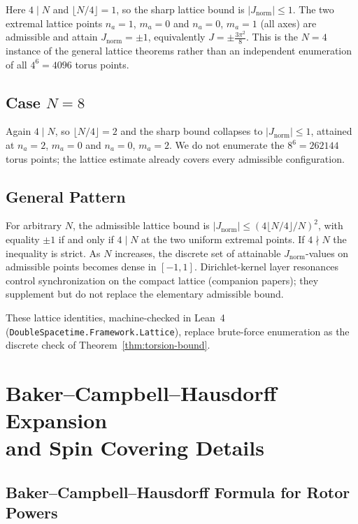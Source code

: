 \documentclass[a4paper]{article}
\theoremstyle{definition}
\theoremstyle{remark}
\newcommand{\Jnorm}{J_{\mathrm{norm}}}
\newcommand{\Jbound}{\frac{3\pi^2}{8}}
\begin{document}
Here \(4\mid N\) and \(\lfloor N/4\rfloor=1\), so the sharp lattice bound is \(|\Jnorm|\le 1\). The two extremal lattice points \(n_a=1\), \(m_a=0\) and \(n_a=0\), \(m_a=1\) (all axes) are admissible and attain \(\Jnorm=\pm 1\), equivalently \(J=\pm\Jbound\). This is the \(N=4\) instance of the general lattice theorems rather than an independent enumeration of all \(4^6=4096\) torus points.

\subsection{Case \texorpdfstring{$N = 8$}{N = 8}}

Again \(4\mid N\), so \(\lfloor N/4\rfloor=2\) and the sharp bound collapses to \(|\Jnorm|\le 1\), attained at \(n_a=2\), \(m_a=0\) and \(n_a=0\), \(m_a=2\). We do not enumerate the \(8^6=262144\) torus points; the lattice estimate already covers every admissible configuration.

\subsection{General Pattern}

For arbitrary \( N \), the admissible lattice bound is \(|\Jnorm|\le(4\lfloor N/4\rfloor/N)^2\), with equality \(\pm 1\) if and only if \(4\mid N\) at the two uniform extremal points. If \(4\nmid N\) the inequality is strict. As \( N \) increases, the discrete set of attainable \(\Jnorm\)-values on admissible points becomes dense in \([-1,1]\). Dirichlet-kernel layer resonances control synchronization on the compact lattice (companion papers); they supplement but do not replace the elementary admissible bound.

These lattice identities, machine-checked in Lean~4 (\texttt{DoubleSpacetime.Framework.Lattice}), replace brute-force enumeration as the discrete check of Theorem~\ref{thm:torsion-bound}.

\section[Baker--Campbell--Hausdorff expansion and spin covering]{Baker--Campbell--Hausdorff Expansion\\ and Spin Covering Details}

\subsection{Baker--Campbell--Hausdorff Formula for Rotor Powers}
\end{document}
